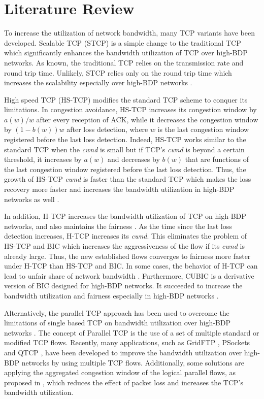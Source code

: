 \documentclass[a4paper, conference]{IEEEtran}
\begin{document}
\section{Literature Review}

To increase the utilization of network bandwidth, many TCP variants have been developed. Scalable TCP (STCP) \cite{kelly2003} is a simple change to the traditional TCP \cite{RFC2581} which significantly enhances the bandwidth utilization of TCP over high-BDP networks. As known, the traditional TCP relies on the transmission rate and round trip time. Unlikely, STCP relies only on the round trip time which increases the scalability especially over high-BDP networks \cite{bateman2008}.

High speed TCP (HS-TCP) \cite{RFC3649} modifies the standard TCP scheme to conquer its limitations. In congestion avoidance, HS-TCP increases its congestion window by $a(w)/w$ after every reception of ACK,  while it decreases the congestion window by $(1 - b(w)) w$ after loss detection, where $w$ is the last congestion window registered before the last loss detection. Indeed, HS-TCP works similar to the standard TCP when the \textit{cwnd} is small but if TCP's \textit{cwnd} is beyond a certain threshold, it increases by $a(w)$ and decreases by $b(w)$ that are functions of the last congestion window registered before the last loss detection. Thus, the growth of HS-TCP \textit{cwnd} is faster than the standard TCP which makes the loss recovery more faster and increases the bandwidth utilization in high-BDP networks as well \cite{bateman2008}.

In addition, H-TCP \cite{shorten2004} increases the bandwidth utilization of TCP on high-BDP networks, and also maintains the fairness \cite{bateman2008}. As the time since the last loss detection increases, H-TCP increases its \textit{cwnd}. This eliminates the problem of HS-TCP \cite{RFC3649} and BIC \cite{xu2004} which increases the aggressiveness of the flow if its \textit{cwnd} is already large. Thus, the new established flows converges to fairness more faster under H-TCP than HS-TCP and BIC. In some cases, the behavior of H-TCP can lead to unfair share of network bandwidth \cite{bateman2008}. Furthermore, CUBIC \cite{ha2008} is a derivative version of BIC designed for high-BDP networks. It succeeded to increase the bandwidth utilization and fairness especially in high-BDP networks \cite{bateman2008}.

Alternatively, the parallel TCP approach has been used to overcome the limitations of single based TCP on bandwidth utilization over high-BDP networks \cite{lekashman1989, iannucci1992, allman1996}. The concept of Parallel TCP is the use of a set of multiple standard or modified TCP flows. Recently, many applications, such as GridFTP \cite{allcock2002,allcock2005}, PSockets \cite{sivakumar2000,grossman2003} and QTCP \cite{qureshi2012}, have been developed to improve the bandwidth utilization over high-BDP networks by using multiple TCP flows. Additionally, some solutions are applying the aggregated congestion window of the logical parallel flows, as proposed in \cite{balakrishnan1999,eggert2000,hacker2004b,hacker2002}, which reduces the effect of packet loss and increases the TCP's bandwidth utilization.
\end{document}
